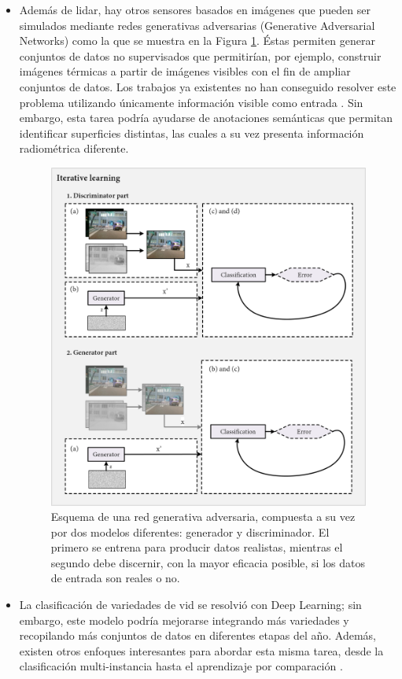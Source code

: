 \begin{itemize}
    \item Además de \acrshort{lidar}, hay otros sensores basados en imágenes que pueden ser simulados mediante redes generativas adversarias (Generative Adversarial Networks) como la que se muestra en la Figura \ref{fig:conclusiones_gan}. Éstas permiten generar conjuntos de datos no supervisados que permitirían, por ejemplo, construir imágenes térmicas a partir de imágenes visibles con el fin de ampliar conjuntos de datos. Los trabajos ya existentes no han conseguido resolver este problema utilizando únicamente información visible como entrada \cite{li_multi-branch_2019, li_i-gans_2021, kniaz_thermalgan_2019, ozkanoglu_infragan_2022, yi_cycle_2023}. Sin embargo, esta tarea podría ayudarse de anotaciones semánticas que permitan identificar superficies distintas, las cuales a su vez presenta información radiométrica diferente.
    \begin{figure}[ht]
        \centering
        \includegraphics[width=\linewidth]{figs/conclusions/gan.png}
        \caption{Esquema de una red generativa adversaria, compuesta a su vez por dos modelos diferentes: generador y discriminador. El primero se entrena para producir datos realistas, mientras el segundo debe discernir, con la mayor eficacia posible, si los datos de entrada son reales o no.}
        \label{fig:conclusiones_gan}
    \end{figure}
    \item La clasificación de variedades de vid se resolvió con Deep Learning; sin embargo, este modelo podría mejorarse integrando más variedades y recopilando más conjuntos de datos en diferentes etapas del año. Además, existen otros enfoques interesantes para abordar esta misma tarea, desde la clasificación multi-instancia \cite{meerdink_multitarget_2022} hasta el aprendizaje por comparación \cite{guan_spatial-spectral_2022}. 
\end{itemize}

